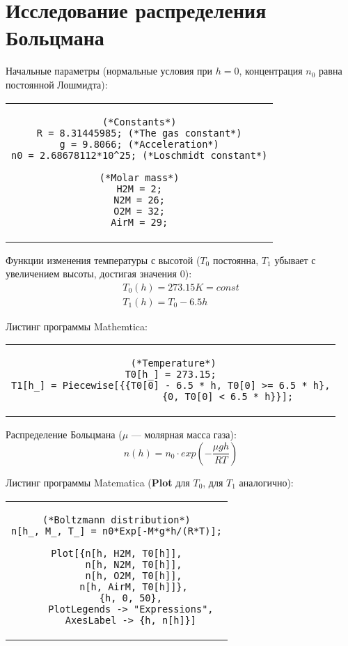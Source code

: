 \newpage
\section[Исследование распределения Больцмана]{Исследование распределения Больцмана}

Начальные параметры (нормальные условия при $h = 0$, концентрация $n_{0}$ равна постоянной Лошмидта):
\begin{center}
    \begin{tabular}{c}
    \begin{lstlisting}
(*Constants*)
R = 8.31445985; (*The gas constant*)
g = 9.8066; (*Acceleration*)
n0 = 2.68678112*10^25; (*Loschmidt constant*)

(*Molar mass*)
H2M = 2;
N2M = 26;
O2M = 32;
AirM = 29;
    \end{lstlisting}
    \end{tabular}
\end{center}

Функции изменения температуры с высотой ($T_{0}$ постоянна, $T_{1}$ убывает с увеличением высоты, достигая значения 0):
\begin{equation*}
    \begin{gathered}
        T_{0}(h) = 273.15K = const\\
        T_{1}(h) = T_{0} - 6.5h
    \end{gathered}
\end{equation*}

Листинг программы Mathemtica:
\begin{center}
    \begin{tabular}{c}
    \begin{lstlisting}
 (*Temperature*)
T0[h_] = 273.15;
T1[h_] = Piecewise[{{T0[0] - 6.5 * h, T0[0] >= 6.5 * h},
                    {0, T0[0] < 6.5 * h}}];
    \end{lstlisting}
    \end{tabular}
\end{center}

Распределение Больцмана ($\mu$ --- молярная масса газа):
\begin{equation*}
    n(h) = n_{0} \cdot exp(-\frac{\mu  gh}{RT})
\end{equation*}


Листинг программы Matematica (\textbf{Plot} для $T_{0}$, для $T_{1}$ аналогично):
\begin{center}
    \begin{tabular}{c}
    \begin{lstlisting}
(*Boltzmann distribution*)
n[h_, M_, T_] = n0*Exp[-M*g*h/(R*T)];

Plot[{n[h, H2M, T0[h]],
      n[h, N2M, T0[h]],
      n[h, O2M, T0[h]],
      n[h, AirM, T0[h]]},
     {h, 0, 50},
     PlotLegends -> "Expressions",
     AxesLabel -> {h, n[h]}]
    \end{lstlisting}
    \end{tabular}
\end{center}


